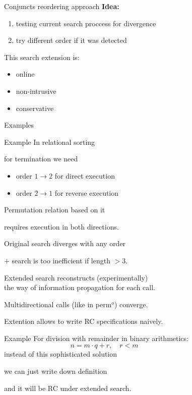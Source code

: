 \documentclass[final,20pt]{beamer}
\begin{document}
\begin{frame}[t]
\begin{columns}[t]
\begin{column}{\onecolwid}
  \end{column}

  \begin{column}{\sepwid}\end{column} %

  \begin{column}{\onecolwid} %
    
    \begin{block}{Conjuncts reordering approach}
      \textbf{Idea:} 
      \begin{enumerate}
        \item testing current search proccess for divergence
        \item try different order if it was detected
      \end{enumerate}
      This search extension is:
      \begin{itemize}
        \item online
        \item non-intrusive
        \item conservative
      \end{itemize}
    \end{block}
    
    \begin{block}{Examples}
      \begin{exampleblock}{Example}
        In relational sorting
	    
        for termination we need
        \begin{itemize}
        \item order $1 \to 2$ for direct execution
        \item order $2 \to 1$ for reverse execution
        \end{itemize}
        \bigskip
        Permutation relation based on it
        
        requires execution in both directions.
        \bigskip
        
        Original search diverges with any order
        
        + search is too inefficient if length $> 3$.
	 \end{exampleblock}
     Extended search reconstructs (experimentally) \\ the way of information propagation for each call.

     Multidirectional calls (like in {\ttfamily perm$^o$}) converge.
      \bigskip
      \bigskip

     Extention allows to write RC specifications naively.
      \begin{exampleblock}{Example}
        For division with remainder in binary arithmetics:
        \[ n = m \cdot q + r, \quad r < m \]
        instead of this sophisticated solution
        
        we can just write down definition
        
        and it will be RC under extended search.
      \end{exampleblock}
    \end{block}


\end{column}
\end{columns}
\end{frame}
\end{document}
